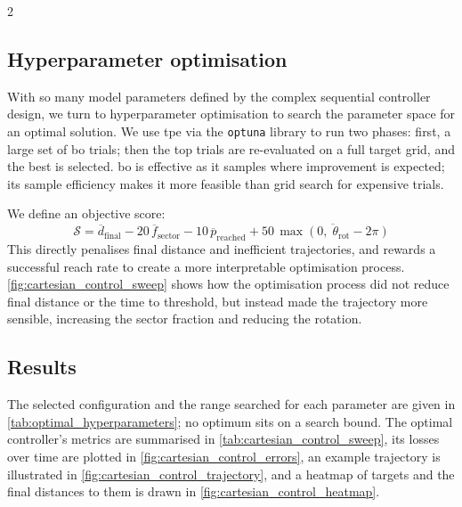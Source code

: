 \documentclass[a4paper, 10pt]{article}
\let\cite\supercite
\begin{document}
\begin{multicols*}{2}
  \subsection*{Hyperparameter optimisation}

  With so many model parameters defined by the complex sequential controller
  design, we turn to hyperparameter optimisation to search the parameter space
  for an optimal solution. We use \ac{tpe} via the \texttt{optuna} library
  \cite{akibaOptunaNextgenerationHyperparameter2019} to run two phases: first, a
  large set of \ac{bo} trials; then the top trials are re-evaluated on a full
  target grid, and the best is selected. \ac{bo} is effective as it samples
  where improvement is expected; its sample efficiency makes it more feasible than grid search for expensive trials.

  We define an objective score:
  \begin{equation*}
    \mathcal{S} = \overline{d}_{\mathrm{final}}
    - 20\,\overline{f}_{\mathrm{sector}}
    - 10\,\overline{p}_{\mathrm{reached}}
    + 50\,\overline{\max\!\left(0,\;\theta_{\mathrm{rot}} - 2\pi\right)}
  \end{equation*}
  This directly penalises final distance and inefficient trajectories, and rewards a successful reach rate to create a more interpretable optimisation process.
  \autoref{fig:cartesian_control_sweep} shows how the optimisation process did
  not reduce final distance or the time to threshold, but instead made the
  trajectory more sensible, increasing the sector fraction and reducing the
  rotation.


  \subsection*{Results}

  The selected configuration and the range searched for each parameter are given
  in \autoref{tab:optimal_hyperparameters}; no optimum sits on a search bound.
  The optimal controller's metrics are summarised in
  \autoref{tab:cartesian_control_sweep}, its losses over time are plotted in
  \autoref{fig:cartesian_control_errors}, an example trajectory is illustrated
  in \autoref{fig:cartesian_control_trajectory}, and a heatmap of targets and
  the final distances to them is drawn in
  \autoref{fig:cartesian_control_heatmap}.


\end{multicols*}
\end{document}
